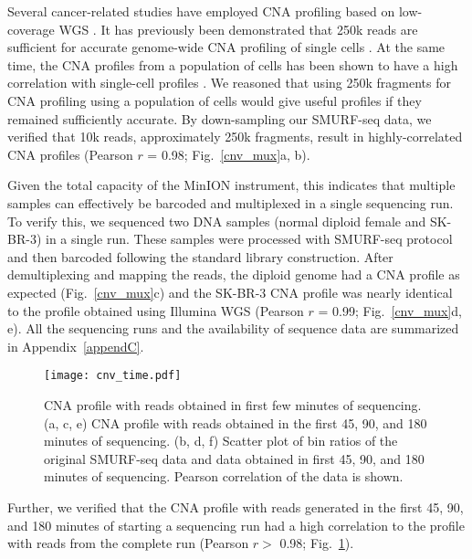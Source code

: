 Several cancer-related studies have employed CNA profiling based on
low-coverage WGS \citep{macintyre2018copy,kader2016copy}.  It has
previously been demonstrated that 250k reads are sufficient for accurate
genome-wide CNA profiling of single cells \citep{baslan2015optimizing}.
At the same time, the CNA profiles from a population of cells has been
shown to have a high correlation with single-cell profiles
\citep{navin2011tumour,baslan2015optimizing}. We reasoned that using
250k fragments for CNA profiling using a population of cells would give
useful profiles if they remained sufficiently accurate.  By
down-sampling our SMURF-seq data, we verified that 10k reads,
approximately 250k fragments, result in highly-correlated CNA profiles
(Pearson $r$ = 0.98; Fig.~\ref{cnv_mux}a, b).

Given the total capacity of the MinION instrument, this indicates that
multiple samples can effectively be barcoded and multiplexed in a single
sequencing run.
To verify this, we sequenced two DNA samples (normal diploid female and
SK-BR-3) in a single run.  These samples were processed with SMURF-seq
protocol and then barcoded following the standard library construction.
After demultiplexing and mapping the reads, the diploid genome had a CNA
profile as expected (Fig.~\ref{cnv_mux}c) and the SK-BR-3 CNA profile
was nearly identical to the profile obtained using Illumina WGS (Pearson
$r$ = 0.99; Fig.~\ref{cnv_mux}d, e). All the sequencing runs and the
availability of sequence data are summarized in Appendix~\ref{appendC}.

\begin{figure}[t!]
\centering
\texttt{[image: cnv\_time.pdf]}
\caption[CNA profile with reads obtained in first few minutes of
  sequencing]{
  CNA profile with reads obtained in first few minutes of sequencing.
  (a, c, e) CNA profile  with reads obtained in the first 45, 90,
  and 180 minutes of sequencing.
  (b, d, f) Scatter plot of bin ratios of the original
  SMURF-seq data and data obtained in first 45, 90, and 180
  minutes of sequencing. Pearson correlation of the data is shown.}
  \label{cnv_time}
\end{figure}

Further, we verified that the CNA profile with reads generated in the
first 45, 90, and 180 minutes of starting a sequencing run had a high
correlation to the profile with reads from the complete run (Pearson
$r>$ 0.98; Fig.~\ref{cnv_time}).

